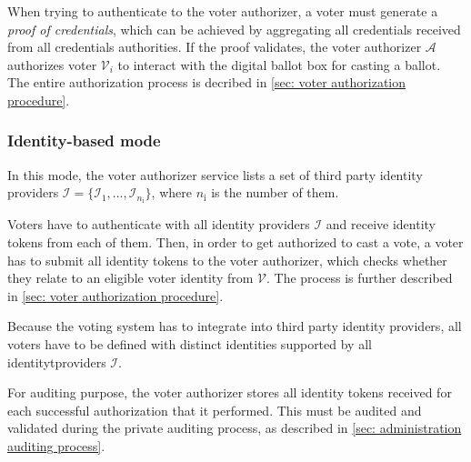 When trying to authenticate to the voter authorizer, a voter must generate a \textit{proof of credentials}, which can be achieved by aggregating all credentials received from all credentials authorities. If the proof validates, the voter authorizer $\mathcal{A}$ authorizes voter $\mathcal{V}_i$ to interact with the digital ballot box for casting a ballot. The entire authorization process is decribed in \cref{sec: voter authorization procedure}.


\subsubsection{Identity-based mode} \label{sec: identity-based mode}
In this mode, the voter authorizer service lists a set of third party identity providers $\boldsymbol{\mathcal{I}} = \{ \mathcal{I}_1, ..., \mathcal{I}_{n_\mathrm{i}} \}$, where $n_\mathrm{i}$ is the number of them.

Voters have to authenticate with all identity providers $\boldsymbol{\mathcal{I}}$ and receive identity tokens from each of them. Then, in order to get authorized to cast a vote, a voter has to submit all identity tokens to the voter authorizer, which checks whether they relate to an eligible voter identity from $\boldsymbol{\mathcal{V}}$. The process is further described in \cref{sec: voter authorization procedure}.

Because the voting system has to integrate into third party identity providers, all voters have to be defined with distinct identities supported by all identitytproviders $\boldsymbol{\mathcal{I}}$.

For auditing purpose, the voter authorizer stores all identity tokens received for each successful authorization that it performed. This must be audited and validated during the private auditing process, as described in \cref{sec: administration auditing process}.
